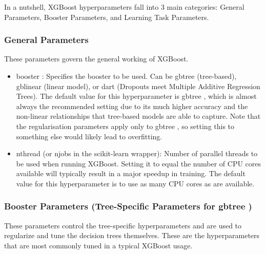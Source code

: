 In a nutshell, XGBoost hyperparameters fall into 3 main categories: General Parameters, Booster Parameters, and Learning Task Parameters.

\subsubsection{General Parameters} 
These parameters govern the general working of XGBoost.

\begin{itemize}[noitemsep] 
\item booster : Specifies the booster to be used. Can be gbtree (tree-based), gblinear (linear model), or dart (Dropouts meet Multiple Additive Regression Trees). The default value for this hyperparameter is gbtree , which is almost always the recommended setting due to its much higher accuracy and the non-linear relationships that tree-based models are able to capture. Note that the regularisation parameters apply only to gbtree , so setting this to something else would likely lead to overfitting.

\item nthread (or n\textunderscore jobs in the scikit-learn wrapper): Number of parallel threads to be used when running XGBoost. Setting it to equal the number of CPU cores available will typically result in a major speedup in training. The default value for this hyperparameter is to use as many CPU cores as are available.

\end{itemize} 

\subsubsection{Booster Parameters (Tree-Specific Parameters for gbtree )} 
These parameters control the tree-specific hyperparameters and are used to regularize and tune the decision trees themselves. These are the hyperparameters that are most commonly tuned in a typical XGBoost usage.

